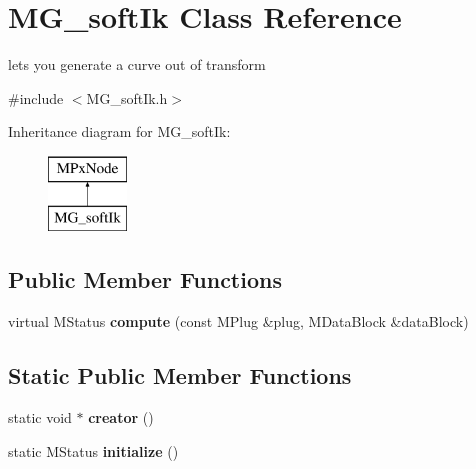 \hypertarget{class_m_g__soft_ik}{\section{M\-G\-\_\-soft\-Ik Class Reference}
\label{class_m_g__soft_ik}
}


lets you generate a curve out of transform  




{\ttfamily \#include $<$M\-G\-\_\-soft\-Ik.\-h$>$}

Inheritance diagram for M\-G\-\_\-soft\-Ik\-:\begin{figure}[H]
\begin{center}
\leavevmode
\includegraphics[height=2.000000cm]{class_m_g__soft_ik}
\end{center}
\end{figure}
\subsection*{Public Member Functions}
\begin{DoxyCompactItemize}
\item 
\hypertarget{class_m_g__soft_ik_ae7f2c09fc04bee1abfeafea4afe4b736}{virtual M\-Status {\bfseries compute} (const M\-Plug \&plug, M\-Data\-Block \&data\-Block)}\label{class_m_g__soft_ik_ae7f2c09fc04bee1abfeafea4afe4b736}

\end{DoxyCompactItemize}
\subsection*{Static Public Member Functions}
\begin{DoxyCompactItemize}
\item 
\hypertarget{class_m_g__soft_ik_a4c117d6821041e37c4ff5e8692584dba}{static void $\ast$ {\bfseries creator} ()}\label{class_m_g__soft_ik_a4c117d6821041e37c4ff5e8692584dba}

\item 
\hypertarget{class_m_g__soft_ik_a90f01001e188fe3edbfb2aa4f69af29b}{static M\-Status {\bfseries initialize} ()}\label{class_m_g__soft_ik_a90f01001e188fe3edbfb2aa4f69af29b}

\end{DoxyCompactItemize}
